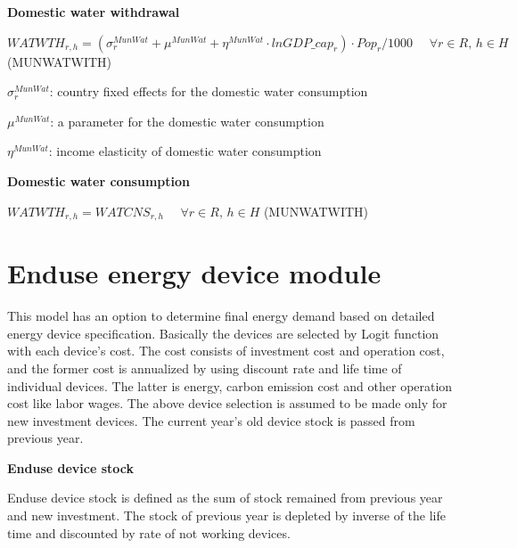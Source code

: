 \documentclass[10pt,a4paper,titlepage,dvipdfmx]{book}
\begin{document}
\begin{flushleft}\textbf{Domestic water withdrawal}\end{flushleft}


\begin{center}$WATWTH_{r,h}=\left(\sigma _{r}^{MunWat}+{\mu ^{MunWat}}+{\eta ^{MunWat}}\cdot lnGDP\_ cap_{r}\right)\cdot Pop_{r}/1000\,\,\,\,\,\,\,\,\forall r\in R,\,h\in H$ (MUNWATWITH)
\end{center}

\begin{flushleft}
$\sigma _{r}^{MunWat}$: country fixed effects for the domestic water consumption

$\mu ^{MunWat}$: a parameter for the domestic water consumption 

$\eta ^{MunWat}$: income elasticity of domestic water consumption
\end{flushleft}

\begin{flushleft}\textbf{Domestic water consumption}\end{flushleft}


\begin{center}$WATWTH_{r,h}=WATCNS_{r,h}\,\,\,\,\,\,\,\,\forall r\in R,\,h\in H$ (MUNWATWITH)
\end{center}

\section{\label{sec:EndEneDev}Enduse energy device module}

This model has an option to determine final energy demand based on detailed energy device specification. Basically the devices are selected by Logit function with each device's cost. The cost consists of investment cost and operation cost, and the former cost is annualized by using discount rate and life time of individual devices. The latter is energy, carbon emission cost and other operation cost like labor wages.  The above device selection is assumed to be made only for new investment devices. The current year's old device stock is passed from previous year. 

\begin{flushleft}\textbf{Enduse device stock}\end{flushleft}

Enduse device stock is defined as the sum of stock remained from previous year and new investment. The stock of previous year is depleted by inverse of the life time and discounted by rate of not working devices.
\end{document}
